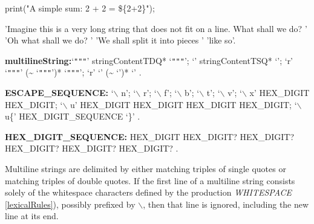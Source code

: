 \documentclass{article}
\newcommand{\code}[1]{{\sf #1}}
\begin{document}
\begin{dartCode}
print("A simple sum: 2 + 2 =  \$\{2+2\}");
\end{dartCode}






\begin{dartCode}
'Imagine this is a very long string that does not fit on a line. What shall we do? '
'Oh what shall we do? '
'We shall split it into pieces '
'like so'.
\end{dartCode}





\begin{grammar}
 {\bf multilineString:}`{\escapegrammar \texttt{"""}}' stringContentTDQ*   `{\escapegrammar \texttt{"""}}';
      `{\escapegrammar \code{'}\code{'}\code{'}}' stringContentTSQ* `{\escapegrammar \code{'}\code{'}\code{'}}';
      `r' `{\escapegrammar \texttt{"""}}'  (\~{} `{\escapegrammar \texttt{"""}}')*   `{\escapegrammar \texttt{"""}}';
      `r' `{\escapegrammar \code{'}\code{'}\code{'}}' (\~{} `{\escapegrammar \code{'}\code{'}\code{'}}')* `{\escapegrammar \code{'}\code{'}\code{'}}'
    .


    {\bf ESCAPE\_SEQUENCE:} `$\backslash$ n';
    `$\backslash$ r';
   `$\backslash$ f';
   `$\backslash$ b';
  `$\backslash$ t';
   `$\backslash$ v';
  `$\backslash$ x' HEX\_DIGIT HEX\_DIGIT;
   `$\backslash$ u' HEX\_DIGIT HEX\_DIGIT HEX\_DIGIT HEX\_DIGIT;
   `$\backslash$ u\{' HEX\_DIGIT\_SEQUENCE `\}'
  .

{\bf HEX\_DIGIT\_SEQUENCE:}
     HEX\_DIGIT HEX\_DIGIT? HEX\_DIGIT? HEX\_DIGIT? HEX\_DIGIT? HEX\_DIGIT?
    .

\end{grammar}

\LMHash{}
Multiline strings are delimited by either matching triples of single quotes or matching triples of double quotes. If the first line of a multiline string consists solely of the whitespace characters defined by the production {\em WHITESPACE}  \ref{lexicalRules}), possibly prefixed by $\backslash$, then that line is ignored, including the new line at its end.
\end{document}
